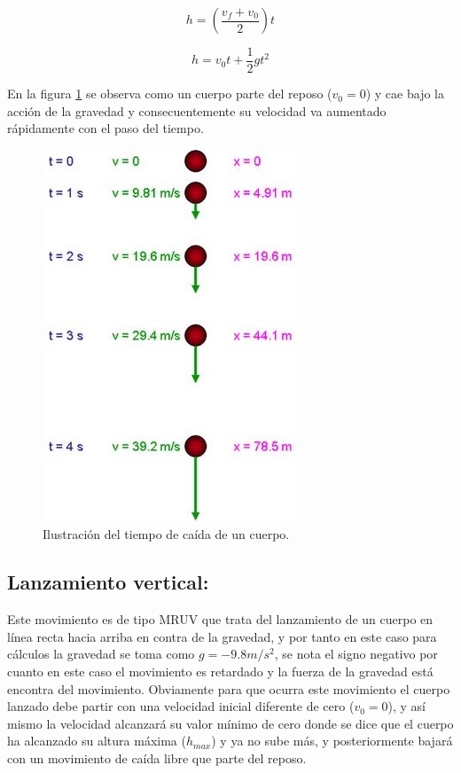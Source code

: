 \documentclass[a5paper,pagesize,10pt,bibtotoc,pointlessnumbers,
normalheadings,DIV=9,fleqn,x11names,table,twoside=false]{scrbook}
\begin{document}
\begin{equation}
 h = (\frac{v_f + v_0}{2})t
\end{equation}

\begin{equation}
 h = v_0t + \frac{1}{2}gt^2
\end{equation}

En la figura \ref{caidalibre2} se observa como un cuerpo parte del reposo ($v_0 = 0$) y cae bajo la acción de la gravedad y 
consecuentemente su velocidad va aumentado rápidamente con el paso del tiempo.
 
\begin{figure}[ht]
 \centering
 \includegraphics[scale=0.4]{images/freefall-timeline-large.jpg}
 \caption{Ilustración del tiempo de caída de un cuerpo.}\label{caidalibre2}
\end{figure}  
 
\subsection{Lanzamiento vertical:}

Este movimiento es de tipo MRUV que trata del lanzamiento de un cuerpo en línea recta hacia arriba en contra de la gravedad, y 
por tanto en este caso para cálculos la gravedad se toma como $g = -9.8 m/s^2$, se nota el signo negativo por cuanto en este caso 
el movimiento es retardado y la fuerza de la gravedad está encontra del movimiento. Obviamente para que ocurra este movimiento el 
cuerpo lanzado debe partir con una velocidad inicial diferente de cero ($v_0 = 0$), y así mismo la velocidad alcanzará su valor 
mínimo de cero donde se dice que el cuerpo ha alcanzado su altura máxima ($h_{max}$) y ya no sube más, y posteriormente bajará con 
un movimiento de caída libre que parte del reposo.
 
\end{document}
